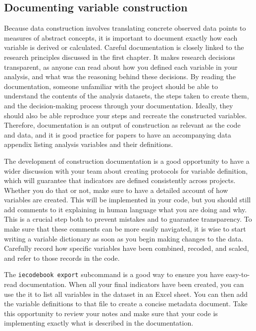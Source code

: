 \subsection{Documenting variable construction}

Because data construction involves translating concrete observed data points
to measures of abstract concepts,
it is important to document exactly how each variable is derived or calculated.
Careful documentation is closely linked to the research principles discussed in the first chapter.
It makes research decisions transparent, 
as anyone can read about how you defined each variable in your analysis,
and what was the reasoning behind these decisions.
By reading the documentation, 
someone unfamiliar with the project should be able to understand the contents of the analysis datasets,
the steps taken to create them, and the decision-making process through your documentation.
Ideally, they should also be able reproduce your steps and recreate the constructed variables.
Therefore, documentation is an output of construction as relevant as the code and data,
and it is good practice for papers to have an accompanying data appendix
listing analysis variables and their definitions.

The development of construction documentation is a good opportunity to have 
a wider discussion with your team about creating protocols for variable definition,
which will guarantee that indicators are defined consistently across projects.
Whether you do that or not,
make sure to have a detailed account of how variables are created.
This will be implemented in your code, but you should still
add comments to it explaining in human language what you are doing and why.
This is a crucial step both to prevent mistakes and to guarantee transparency.
To make sure that these comments can be more easily navigated,
it is wise to start writing a variable dictionary as soon as you begin making changes to the data.
Carefully record how specific variables have been combined, recoded, and scaled,
and refer to those records in the code.

The \texttt{iecodebook export} subcommand is 
a good way to ensure you have easy-to-read documentation.
When all your final indicators have been created,
you can use the it to list all variables in the dataset in an Excel sheet.
You can then add the variable definitions to that file to create a concise metadata document.
Take this opportunity to review your notes and make sure that your code
is implementing exactly what is described in the documentation.

